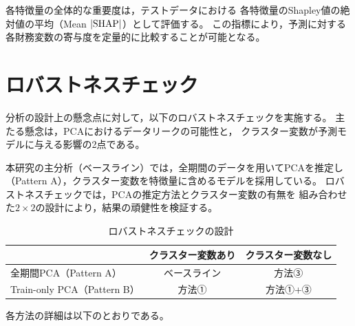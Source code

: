 各特徴量の全体的な重要度は，テストデータにおける
各特徴量のShapley値の絶対値の平均（Mean $|\mathrm{SHAP}|$）として評価する。
この指標により，予測に対する各財務変数の寄与度を定量的に比較することが可能となる。

\section{ロバストネスチェック}
\label{sec:robustness}

分析の設計上の懸念点に対して，以下のロバストネスチェックを実施する。
主たる懸念は，PCAにおけるデータリークの可能性と，
クラスター変数が予測モデルに与える影響の2点である。

本研究の主分析（ベースライン）では，全期間のデータを用いてPCAを推定し
（Pattern A），クラスター変数を特徴量に含めるモデルを採用している。
ロバストネスチェックでは，PCAの推定方法とクラスター変数の有無を
組み合わせた$2 \times 2$の設計により，結果の頑健性を検証する。

\begin{table}[htbp]
  \centering
  \caption{ロバストネスチェックの設計}
  \label{tab:robustness-design}
  \begin{tabular}{lcc}
    \toprule
    & クラスター変数あり & クラスター変数なし \\
    \midrule
    全期間PCA（Pattern A） & ベースライン & 方法③ \\
    Train-only PCA（Pattern B） & 方法① & 方法①+③ \\
    \bottomrule
  \end{tabular}
\end{table}

各方法の詳細は以下のとおりである。

